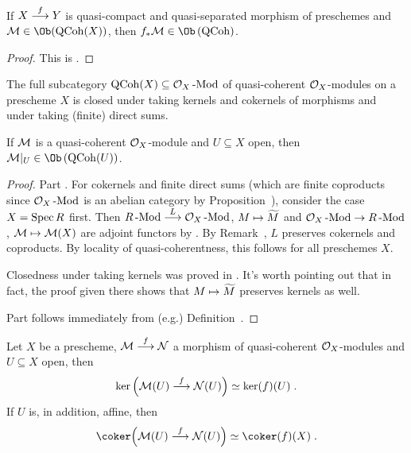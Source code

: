 \documentclass[a4paper,parskip=half,numbers=enddot, DIV=12]{scrreprt}
\begin{document}
\begin{prop}
	If $X\morphism[f]Y$ is quasi-compact and quasi-separated morphism of preschemes and $\Mm\in\Ob(\cat{QCoh}(X))$, then $f_*\Mm\in\Ob\left(\cat{QCoh}\right)$.
\end{prop}
\begin{proof}
	This is \cite[Proposition~1.5.2]{alggeo1}.
\end{proof}
\begin{prop}
	\begin{alphanumerate}
		\item {}The full subcategory $\operatorname{QCoh}(X)\subseteq\mathcal{O}_X\operatorname{-Mod}$ of quasi-coherent $\mathcal{O}_X$-modules on a prescheme $X$ is closed under taking kernels and cokernels of morphisms and under taking (finite) direct sums.
		\item If $\mathcal{M}$ is a quasi-coherent $\mathcal{O}_X$-module and $U\subseteq X$ open, then $\Mm|_U\in\Ob\left(\cat{QCoh}(U)\right)$.
	\end{alphanumerate}
\end{prop}
\begin{proof}
	Part . For cokernels and finite direct sums (which are finite coproducts since $\mathcal{O}_X\operatorname{-Mod}$ is an abelian category by Proposition~), consider the case $X=\operatorname{Spec} R$ first. Then $R\cat{-Mod}\morphism[L]\Oo_X\cat{-Mod}$, $M\mapsto\snake{M}$ and $\Oo_X\cat{-Mod}\morphism R\cat{-Mod}$, $\mathcal{M}\mapsto\mathcal{M}(X)$ are adjoint functors by . By Remark~, $L$ preserves cokernels and coproducts. By locality of quasi-coherentness, this follows for all preschemes $X$.
	
	Closedness under taking kernels was proved in \cite[Fact~1.5.3]{alggeo1}. It's worth pointing out that in fact, the proof given there shows that $M\mapsto\snake{M}$ preserves kernels as well. 
	
	Part  follows immediately from (e.g.) Definition~.
\end{proof}
\begin{cor}
	Let $X$ be a prescheme, $\Mm\morphism[f]\Nn$ a morphism of quasi-coherent $\mathcal{O}_X$-modules and $U\subseteq X$ open, then
	\begin{align*}
		\ker\Big(\Mm(U)\morphism[f]\Nn(U)\Big)\simeq\ker(f)(U)\;.
	\end{align*}
	If $U$ is, in addition, affine, then
	\begin{align*}
		\coker\Big(\Mm(U)\morphism[f]\Nn(U)\Big)\simeq\coker(f)(X)\;.
	\end{align*}
\end{cor}
\end{document}
